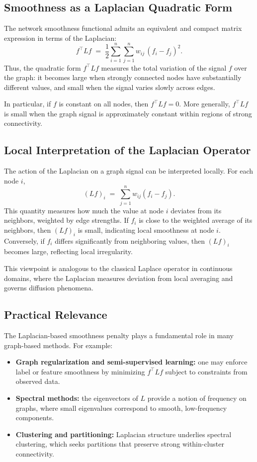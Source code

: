 \documentclass[11pt]{article}
\begin{document}
\subsection{Smoothness as a Laplacian Quadratic Form}
The network smoothness functional admits an equivalent and compact matrix expression in terms of the Laplacian:
\[
f^\top L f
\;=\;
\frac{1}{2}\sum_{i=1}^n\sum_{j=1}^n w_{ij}\,(f_i-f_j)^2.
\]
Thus, the quadratic form \(f^\top L f\) measures the total variation of the signal \(f\) over the graph: it becomes large when strongly connected nodes have substantially different values, and small when the signal varies slowly across edges.

In particular, if \(f\) is constant on all nodes, then \(f^\top L f = 0\). More generally, \(f^\top L f\) is small when the graph signal is approximately constant within regions of strong connectivity.

\subsection{Local Interpretation of the Laplacian Operator}
The action of the Laplacian on a graph signal can be interpreted locally. For each node \(i\),
\[
(Lf)_i
\;=\;
\sum_{j=1}^n w_{ij}(f_i-f_j).
\]
This quantity measures how much the value at node \(i\) deviates from its neighbors, weighted by edge strengths.
If \(f_i\) is close to the weighted average of its neighbors, then \((Lf)_i\) is small, indicating local smoothness at node \(i\).
Conversely, if \(f_i\) differs significantly from neighboring values, then \((Lf)_i\) becomes large, reflecting local irregularity.

This viewpoint is analogous to the classical Laplace operator in continuous domains, where the Laplacian measures deviation from local averaging and governs diffusion phenomena.

\subsection{Practical Relevance}
The Laplacian-based smoothness penalty plays a fundamental role in many graph-based methods. For example:
\begin{itemize}
    \item \textbf{Graph regularization and semi-supervised learning:} one may enforce label or feature smoothness by minimizing \(f^\top L f\) subject to constraints from observed data.
    \item \textbf{Spectral methods:} the eigenvectors of \(L\) provide a notion of frequency on graphs, where small eigenvalues correspond to smooth, low-frequency components.
    \item \textbf{Clustering and partitioning:} Laplacian structure underlies spectral clustering, which seeks partitions that preserve strong within-cluster connectivity.
\end{itemize}
\end{document}
